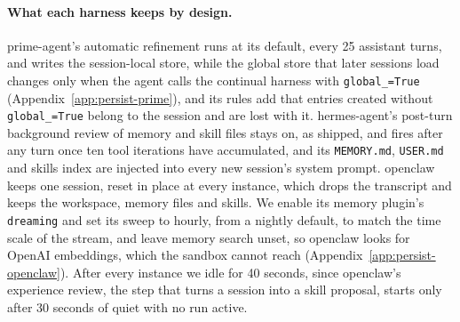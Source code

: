 \paragraph{What each harness keeps by design.} prime-agent's automatic refinement runs at its default, every 25 assistant turns, and writes the session-local store, while the global store that later sessions load changes only when the agent calls the continual harness with \texttt{global\_=True} (Appendix~\ref{app:persist-prime}), and its rules add that entries created without \texttt{global\_=True} belong to the session and are lost with it. hermes-agent's post-turn background review of memory and skill files stays on, as shipped, and fires after any turn once ten tool iterations have accumulated, and its \texttt{MEMORY.md}, \texttt{USER.md} and skills index are injected into every new session's system prompt. openclaw keeps one session, reset in place at every instance, which drops the transcript and keeps the workspace, memory files and skills. We enable its memory plugin's \texttt{dreaming} and set its sweep to hourly, from a nightly default, to match the time scale of the stream, and leave memory search unset, so openclaw looks for OpenAI embeddings, which the sandbox cannot reach (Appendix~\ref{app:persist-openclaw}). After every instance we idle for 40 seconds, since openclaw's experience review, the step that turns a session into a skill proposal, starts only after 30 seconds of quiet with no run active.

